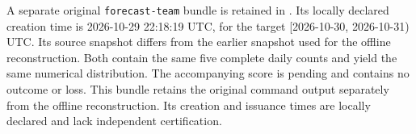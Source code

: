 A separate original \texttt{forecast-team} bundle is retained in . Its locally declared creation time is 2026-10-29 22:18:19 UTC, for the target [2026-10-30, 2026-10-31) UTC. Its source snapshot differs from the earlier snapshot used for the offline reconstruction. Both contain the same five complete daily counts and yield the same numerical distribution. The accompanying score is pending and contains no outcome or loss. This bundle retains the original command output separately from the offline reconstruction. Its creation and issuance times are locally declared and lack independent certification.
